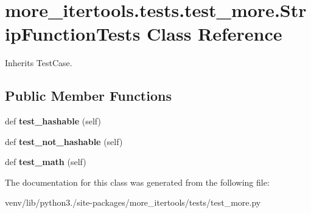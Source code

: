 \hypertarget{classmore__itertools_1_1tests_1_1test__more_1_1_strip_function_tests}{}\section{more\+\_\+itertools.\+tests.\+test\+\_\+more.\+Strip\+Function\+Tests Class Reference}
\label{classmore__itertools_1_1tests_1_1test__more_1_1_strip_function_tests}


Inherits Test\+Case.

\subsection*{Public Member Functions}
\begin{DoxyCompactItemize}
\item 
\mbox{\label{classmore__itertools_1_1tests_1_1test__more_1_1_strip_function_tests_a5b086800f0e12168894cdf9ecdb8361a}} 
def {\bfseries test\+\_\+hashable} (self)
\item 
\mbox{\label{classmore__itertools_1_1tests_1_1test__more_1_1_strip_function_tests_aed78b2ea52e9727b241ca7211976f203}} 
def {\bfseries test\+\_\+not\+\_\+hashable} (self)
\item 
\mbox{\label{classmore__itertools_1_1tests_1_1test__more_1_1_strip_function_tests_affc9d92019d75cd144be308142a6bae7}} 
def {\bfseries test\+\_\+math} (self)
\end{DoxyCompactItemize}


The documentation for this class was generated from the following file\+:\begin{DoxyCompactItemize}
\item 
venv/lib/python3./site-\/packages/more\+\_\+itertools/tests/test\+\_\+more.\+py\end{DoxyCompactItemize}
